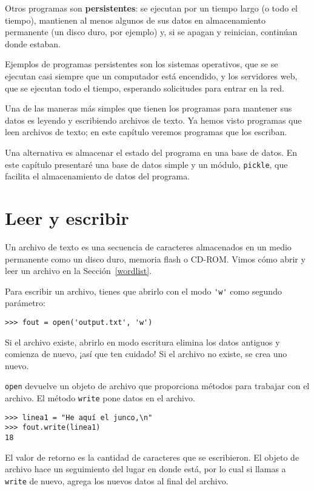 \documentclass[10pt]{book}
\begin{document}
Otros programas son {\bf persistentes}: se ejecutan por un tiempo largo
(o todo el tiempo), mantienen al menos algunos de sus datos
en almacenamiento permanente (un disco duro, por ejemplo) y,
si se apagan y reinician, continúan donde estaban.

Ejemplos de programas persistentes son los sistemas operativos, que se
se ejecutan casi siempre que un computador está encendido, y los servidores web,
que se ejecutan todo el tiempo, esperando solicitudes para entrar en
la red.

Una de las maneras más simples que tienen los programas para mantener sus datos 
es leyendo y escribiendo archivos de texto.  Ya hemos visto
programas que leen archivos de texto; en este capítulo veremos programas
que los escriban.

Una alternativa es almacenar el estado del programa en una base de datos.
En este capítulo presentaré una base de datos simple y un módulo,
{\tt pickle}, que facilita el almacenamiento de datos del programa.


\section{Leer y escribir}

Un archivo de texto es una secuencia de caracteres almacenados en un medio
permanente como un disco duro, memoria flash o CD-ROM.  Vimos cómo
abrir y leer un archivo en la Sección~\ref{wordlist}.

Para escribir un archivo, tienes que abrirlo con el modo \verb"'w'" como segundo
parámetro:

\begin{verbatim}
>>> fout = open('output.txt', 'w')
\end{verbatim}
%
Si el archivo existe, abrirlo en modo escritura elimina
los datos antiguos y comienza de nuevo, ¡así que ten cuidado!
Si el archivo no existe, se crea uno nuevo.

{\tt open} devuelve un objeto de archivo que proporciona métodos para trabajar
con el archivo.
El método {\tt write} pone datos en el archivo.

\begin{verbatim}
>>> linea1 = "He aquí el junco,\n"
>>> fout.write(linea1)
18
\end{verbatim}
%
El valor de retorno es la cantidad de caracteres que se escribieron.
El objeto de archivo hace un seguimiento del lugar en donde está, por lo cual si
llamas a {\tt write} de nuevo, agrega los nuevos datos al final del
archivo.
\end{document}
